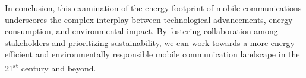 \documentclass[11pt,a4paper]{article}
\begin{document}
In conclusion, this examination of the energy footprint of mobile communications underscores the complex interplay between technological advancements, energy consumption, and environmental impact.
By fostering collaboration among stakeholders and prioritizing sustainability, we can work towards a more energy-efficient and environmentally responsible mobile communication landscape in the 21\textsuperscript{st} century and beyond.

\appendix
\glsaddall
\printnoidxglossary[type=\acronymtype,nonumberlist,style=long]

\renewcommand*{\refname}{\section{References}}
{}
\end{document}
